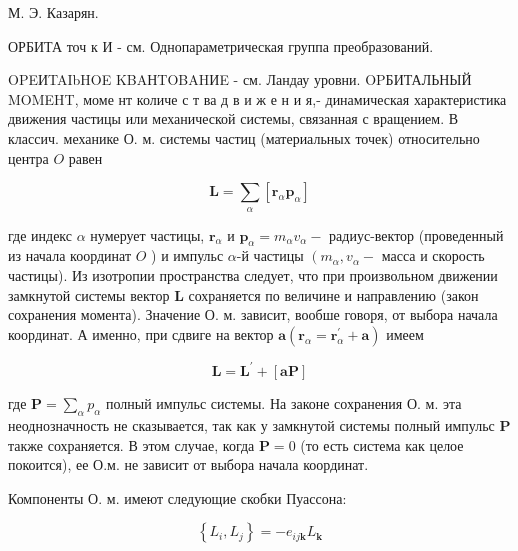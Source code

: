 \documentclass[10pt]{article}
\begin{document}
М. Э. Казарян.



ОРБИТА точ к И - см. Однопараметрическая группа преобразований.



OPEИTAIbHOE KBAНTOBAHИE - см. Ландау уровни. OPБИТАЛЬНЫЙ MOMEHT, моме нт количе с т ва д в и ж е н и я,- динамическая характеристика движения частицы или механической системы, связанная с вращением. В классич. механике О. м. системы частиц (материальных точек) относительно центра $O$ равен



\[

\boldsymbol{L}=\sum_{\alpha}\left[\boldsymbol{r}_{\alpha} \boldsymbol{p}_{\alpha}\right]

\]



где индекс $\alpha$ нумерует частицы, $\boldsymbol{r}_{\alpha}$ и $\boldsymbol{p}_{\alpha}=m_{\alpha} v_{\alpha}-$ радиус-вектор (проведенный из начала координат $O$ ) и импульс $\alpha$-й частицы $\left(m_{\alpha}, v_{\alpha}-\right.$ масса и скорость частицы). Из изотропии пространства следует, что при произвольном движении замкнутой системы вектор $\boldsymbol{L}$ сохраняется по величине и направлению (закон сохранения момента). Значение О. м. зависит, вообше говоря, от выбора начала координат. А именно, при сдвиге на вектор $\boldsymbol{a}\left(\boldsymbol{r}_{\alpha}=\boldsymbol{r}_{\alpha}^{\prime}+\boldsymbol{a}\right)$ имеем



\[

\boldsymbol{L}=\boldsymbol{L}^{\prime}+[\boldsymbol{a P}]

\]



где $\boldsymbol{P}=\sum_{\alpha} p_{\alpha}$ полный импульс системы. На законе сохранения О. м. эта неоднозначность не сказывается, так как у замкнутой системы полный импульс $\boldsymbol{P}$ также сохраняется. В этом случае, когда $\boldsymbol{P}=0$ (то есть система как целое покоится), ее О.м. не зависит от выбора начала координат.



Компоненты О. м. имеют следующие скобки Пуассона:



\[

\left\{L_{i}, L_{j}\right\}=-e_{i j \mathbf{k}} L_{\mathbf{k}}

\]
\end{document}

